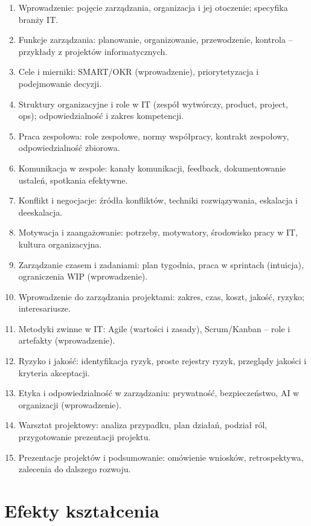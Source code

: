 \documentclass[12pt, a4paper]{article}
\begin{document}
\begin{enumerate}
  \item Wprowadzenie: pojęcie zarządzania, organizacja i jej otoczenie; specyfika branży IT.
  \item Funkcje zarządzania: planowanie, organizowanie, przewodzenie, kontrola – przykłady z projektów informatycznych.
  \item Cele i mierniki: SMART/OKR (wprowadzenie), priorytetyzacja i podejmowanie decyzji.
  \item Struktury organizacyjne i role w IT (zespół wytwórczy, product, project, ops); odpowiedzialność i zakres kompetencji.
  \item Praca zespołowa: role zespołowe, normy współpracy, kontrakt zespołowy, odpowiedzialność zbiorowa.
  \item Komunikacja w zespole: kanały komunikacji, feedback, dokumentowanie ustaleń, spotkania efektywne.
  \item Konflikt i negocjacje: źródła konfliktów, techniki rozwiązywania, eskalacja i deeskalacja.
  \item Motywacja i zaangażowanie: potrzeby, motywatory, środowisko pracy w IT, kultura organizacyjna.
  \item Zarządzanie czasem i zadaniami: plan tygodnia, praca w sprintach (intuicja), ograniczenia WIP (wprowadzenie).
  \item  Wprowadzenie do zarządzania projektami: zakres, czas, koszt, jakość, ryzyko; interesariusze.
  \item  Metodyki zwinne w IT: Agile (wartości i zasady), Scrum/Kanban – role i artefakty (wprowadzenie).
  \item  Ryzyko i jakość: identyfikacja ryzyk, proste rejestry ryzyk, przeglądy jakości i kryteria akceptacji.
  \item  Etyka i odpowiedzialność w zarządzaniu: prywatność, bezpieczeństwo, AI w organizacji (wprowadzenie).
  \item  Warsztat projektowy: analiza przypadku, plan działań, podział ról, przygotowanie prezentacji projektu.
  \item  Prezentacje projektów i podsumowanie: omówienie wniosków, retrospektywa, zalecenia do dalszego rozwoju.
\end{enumerate}

\section{Efekty kształcenia}
\end{document}
